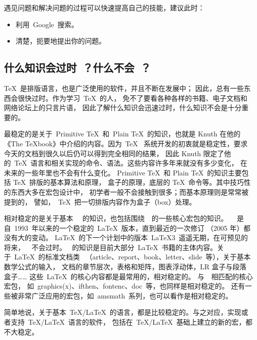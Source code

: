 遇见问题和解决问题的过程可以快速提高自己的技能，建议此时：
\begin{itemize}
  \item 利用~Google~搜索。
  \item 清楚，扼要地提出你的问题。
\end{itemize}

\subsection{什么知识会过时~？什么不会~？}

\TeX~是排版语言，也是广泛使用的软件，并且不断在发展中；
因此，总有一些东西会很快过时。作为学习~\TeX~的人，
免不了要看各种各样的书籍、电子文档和网络论坛上的只言片语，
因此了解什么知识会迅速过时，什么知识不会是十分重要的。

最稳定的是关于~Primitive \TeX~和~Plain \TeX~的知识，也就是 Knuth
在他的《The TeXbook》中介绍的内容。因为~\TeX~
系统开发的初衷就是稳定性，要求今天的文档到很久以后仍可以得到完全相同的结果，
因此 Knuth 限定了他的~\TeX~语言和相关实现的命令、语法。这些内容许多年来就没有多少变化，
在未来的一些年里也不会有什么变化。
Primitive \TeX~和 Plain \TeX~的知识主要包括 \TeX~排版的基本算法和原理，
盒子的原理，底层的 \TeX~命令等。其中技巧性的东西大多在宏包设计中，
初学者一般不会接触到很多；而基本原理则是常常被提到的，
譬如，~\TeX~把一切排版内容作为盒子（box）处理。

相对稳定的是关于基本~\LaTeXe~
的知识，也包括围绕~\LaTeXe~的一些核心宏包的知识。~\LaTeXe~
是自~1993~年以来的一个稳定的~\LaTeX~版本，直到最近的一次修订
（2005 年）都没有大的变动。
\LaTeX~的下一个计划中的版本~\LaTeX 3~遥遥无期，在可预见的将来，~\LaTeXe~不会过时。
\LaTeXe~的知识是目前大部分~\LaTeX~书籍的主体内容。关于~\LaTeX~的标准文档类
~（article、report、book、letter、slide~等），关于基本数学公式的输入，
文档的章节层次，表格和矩阵，图表浮动体，LR 盒子与段落盒子……
这些~\LaTeX~的核心内容都是最常用的，相对稳定的。
与~\LaTeXe~相匹配的核心宏包，
如~graphics(x)、ifthen、fontenc、doc~等，也同样是相对稳定的。
还有一些被非常广泛应用的宏包，如~amsmath~系列，也可以看作是相对稳定的。

简单地说，关于基本~\TeX/\LaTeX~的语言，都是比较稳定的。与之对应，实现或者支持~\TeX/\LaTeX~语言的软件，
包括在~\TeX/\LaTeX~基础上建立的新的宏，都不大稳定。

